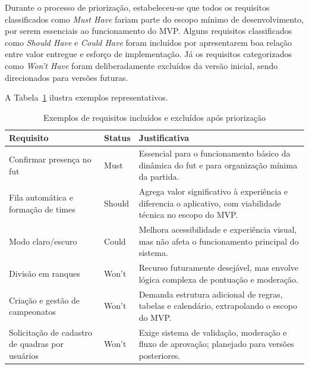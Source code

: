         Durante o processo de priorização, estabeleceu-se que todos os requisitos classificados como \textit{Must Have} fariam parte do escopo mínimo de desenvolvimento, por serem essenciais ao funcionamento do MVP. Alguns requisitos classificados como \textit{Should Have} e \textit{Could Have} foram incluídos por apresentarem boa relação entre valor entregue e esforço de implementação. Já os requisitos categorizados como \textit{Won't Have} foram deliberadamente excluídos da versão inicial, sendo direcionados para versões futuras.

        A Tabela~\ref{tab:priorizacao} ilustra exemplos representativos.

        \begin{table}[h]
            \centering
            \caption{Exemplos de requisitos incluídos e excluídos após priorização}
            \label{tab:priorizacao}
            \begin{tabular}{p{5cm} p{3cm} p{6cm}}
            \toprule
            \textbf{Requisito} & \textbf{Status} & \textbf{Justificativa} \\
            \midrule
        
            Confirmar presença no fut &
            Must &
            Essencial para o funcionamento básico da dinâmica do fut e para organização mínima da partida. \\[0.3em]
        
            Fila automática e formação de times &
            Should &
            Agrega valor significativo à experiência e diferencia o aplicativo, com viabilidade técnica no escopo do MVP. \\[0.3em]
            
            Modo claro/escuro &
            Could &
            Melhora acessibilidade e experiência visual, mas não afeta o funcionamento principal do sistema. \\[0.3em]
        
            \midrule
        
            Divisão em ranques &
            Won't &
            Recurso futuramente desejável, mas envolve lógica complexa de pontuação e moderação. \\[0.3em]
        
            Criação e gestão de campeonatos &
            Won't &
            Demanda estrutura adicional de regras, tabelas e calendário, extrapolando o escopo do MVP. \\[0.3em]
        
            Solicitação de cadastro de quadras por usuários &
            Won't &
            Exige sistema de validação, moderação e fluxo de aprovação; planejado para versões posteriores. \\[0.3em]
        
            \bottomrule
            \end{tabular}
        \end{table}        

